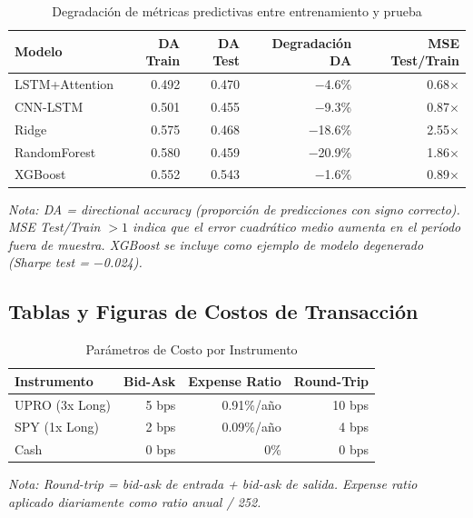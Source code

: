 \begin{table}[H]
\centering
\caption{Degradaci\'on de m\'etricas predictivas entre entrenamiento y prueba}
\label{tab:overfitting}
\small
\begin{tabular}{@{}lrrrr@{}}
\toprule
\textbf{Modelo} & \textbf{DA Train} & \textbf{DA Test} & \textbf{Degradaci\'on DA} & \textbf{MSE Test/Train} \\
\midrule
LSTM+Attention & 0.492 & 0.470 & $-$4.6\% & 0.68$\times$ \\
CNN-LSTM & 0.501 & 0.455 & $-$9.3\% & 0.87$\times$ \\
Ridge & 0.575 & 0.468 & $-$18.6\% & 2.55$\times$ \\
RandomForest & 0.580 & 0.459 & $-$20.9\% & 1.86$\times$ \\
\midrule
XGBoost & 0.552 & 0.543 & $-$1.6\% & 0.89$\times$ \\
\bottomrule
\end{tabular}
\vspace{0.2cm}
\parbox{0.9\textwidth}{\footnotesize\textit{Nota: DA = \textit{directional accuracy} (proporci\'on de predicciones con signo correcto). MSE Test/Train $> 1$ indica que el error cuadr\'atico medio aumenta en el per\'iodo fuera de muestra. XGBoost se incluye como ejemplo de modelo degenerado (Sharpe test = $-$0.024).}}
\end{table}


\subsection{Tablas y Figuras de Costos de Transacci\'on}
\label{sec:appendix_cost_tables}

\begin{table}[H]
\centering
\caption{Par\'ametros de Costo por Instrumento}
\label{tab:tx_costs_detail}
\begin{tabular}{@{}lrrr@{}}
\toprule
\textbf{Instrumento} & \textbf{Bid-Ask} & \textbf{Expense Ratio} & \textbf{Round-Trip} \\
\midrule
UPRO (3x Long) & 5 bps & 0.91\%/a\~no & 10 bps \\
SPY (1x Long) & 2 bps & 0.09\%/a\~no & 4 bps \\
Cash & 0 bps & 0\% & 0 bps \\
\bottomrule
\end{tabular}
\vspace{0.2cm}
\parbox{0.9\textwidth}{\footnotesize\textit{Nota: Round-trip = bid-ask de entrada + bid-ask de salida. Expense ratio aplicado diariamente como ratio anual / 252.}}
\end{table}

